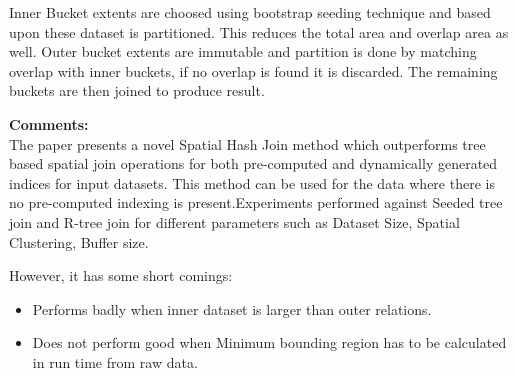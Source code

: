 \documentclass[a4paper,12pt, twoside]{article}
\begin{document}
Inner Bucket extents are choosed using bootstrap seeding technique and based upon these dataset is partitioned. This reduces the total area and overlap area as well. Outer bucket extents are immutable and partition is done by matching overlap with inner buckets, if no overlap is found it is discarded. The remaining buckets are then joined to produce result.

\textbf{Comments:}\\
The paper presents a novel Spatial Hash Join method which outperforms tree based spatial join operations for both pre-computed and dynamically generated indices for input datasets. This method can be used for the data where there is no pre-computed indexing is present.Experiments performed against Seeded tree join and R-tree join for different parameters such as Dataset Size, Spatial Clustering, Buffer size.

However, it has some short comings:
\begin{itemize}
	\item Performs badly when inner dataset is larger than outer relations.
	
	\item Does not perform good when Minimum bounding region has to be calculated in run time from raw data.

\end{itemize}
\end{document}
